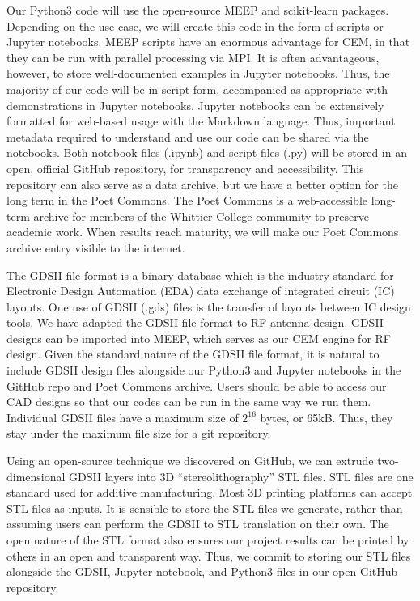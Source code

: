 \documentclass[10pt]{amsart}
\theoremstyle{definition}
\numberwithin{equation}{section}
\begin{document}
Our Python3 code will use the open-source MEEP and scikit-learn packages.  Depending on the use case, we will create this code in the form of scripts or Jupyter notebooks.  MEEP scripts have an enormous advantage for CEM, in that they can be run with parallel processing via MPI.  It is often advantageous, however, to store well-documented examples in Jupyter notebooks.  Thus, the majority of our code will be in script form, accompanied as appropriate with demonstrations in Jupyter notebooks.  Jupyter notebooks can be extensively formatted for web-based usage with the Markdown language.  Thus, important metadata required to understand and use our code can be shared via the notebooks.  Both notebook files (.ipynb) and script files (.py) will be stored in an open, official GitHub repository, for transparency and accessibility.  This repository can also serve as a data archive, but we have a better option for the long term in the Poet Commons.  The Poet Commons is a web-accessible long-term archive for members of the Whittier College community to preserve academic work.  When results reach maturity, we will make our Poet Commons archive entry visible to the internet.  

The GDSII file format is a binary database which is the industry standard for Electronic Design Automation (EDA) data exchange of integrated circuit (IC) layouts.  One use of GDSII (.gds) files is the transfer of layouts between IC design tools.  We have adapted the GDSII file format to RF antenna design.  GDSII designs can be imported into MEEP, which serves as our CEM engine for RF design.  Given the standard nature of the GDSII file format, it is natural to include GDSII design files alongside our Python3 and Jupyter notebooks in the GitHub repo and Poet Commons archive.  Users should be able to access our CAD designs so that our codes can be run in the same way we run them.  Individual GDSII files have a maximum size of $2^{16}$ bytes, or 65kB.  Thus, they stay under the maximum file size for a git repository. 

Using an open-source technique we discovered on GitHub, we can extrude two-dimensional GDSII layers into 3D ``stereolithography'' STL files.  STL files are one standard used for additive manufacturing.  Most 3D printing platforms can accept STL files as inputs.  It is sensible to store the STL files we generate, rather than assuming users can perform the GDSII to STL translation on their own.  The open nature of the STL format also ensures our project results can be printed by others in an open and transparent way.  Thus, we commit to storing our STL files alongside the GDSII, Jupyter notebook, and Python3 files in our open GitHub repository. 
\end{document}
